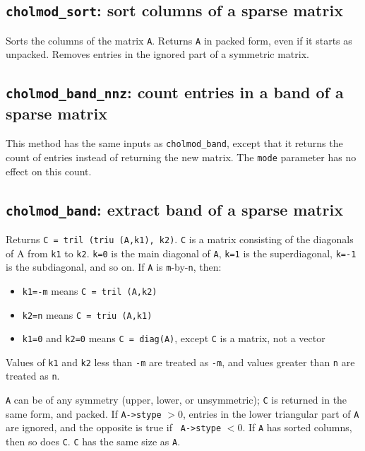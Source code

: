\documentclass[11pt]{article}
\begin{document}
\subsection{{\tt cholmod\_sort}: sort columns of a sparse matrix}


Sorts the columns of the matrix {\tt A}.  Returns  {\tt A} in packed form, even
if it starts as unpacked.  Removes entries in the ignored part of a symmetric
matrix.

\subsection{{\tt cholmod\_band\_nnz}: count entries in a band of a sparse
matrix}


This method has the same inputs as \verb'cholmod_band', except that it
returns the count of entries instead of returning the new matrix.
The \verb'mode' parameter has no effect on this count.

\subsection{{\tt cholmod\_band}: extract band of a sparse matrix}


Returns {\tt C = tril (triu (A,k1), k2)}.  {\tt C} is a matrix consisting of
the diagonals of A from {\tt k1} to {\tt k2}.  {\tt k=0} is the main diagonal
of {\tt A}, {\tt k=1} is the superdiagonal, {\tt k=-1} is the subdiagonal, and
so on.  If {\tt A} is {\tt m}-by-{\tt n}, then:

\begin{itemize}
\item {\tt k1=-m} means {\tt C = tril (A,k2)}
\item {\tt k2=n} means {\tt C = triu (A,k1)}
\item {\tt k1=0} and {\tt k2=0} means {\tt C = diag(A)}, except {\tt C} is a
matrix, not a vector
\end{itemize}

Values of {\tt k1} and {\tt k2} less than {\tt -m} are treated as {\tt -m}, and
values greater than {\tt n} are treated as {\tt n}.

{\tt A} can be of any symmetry (upper, lower, or unsymmetric); {\tt C} is
returned in the same form, and packed.  If {\tt A->stype} $> 0$, entries in the
lower triangular part of {\tt A} are ignored, and the opposite is true if {\tt
A->stype} $< 0$.  If {\tt A} has sorted columns, then so does {\tt C}.  {\tt C}
has the same size as {\tt A}.
\end{document}
